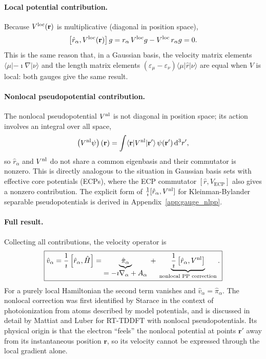 \paragraph{Local potential contribution.}
Because $V^{\mathrm{loc}}(\mathbf{r})$ is multiplicative (diagonal in position
space),
\begin{equation}
  \left[\hat{r}_\alpha,V^{\mathrm{loc}}(\mathbf{r})\right]g
  = r_\alpha\,V^{\mathrm{loc}} g - V^{\mathrm{loc}}\,r_\alpha g = 0.
  \label{eq:comm-r-Vloc}
\end{equation}
This is the same reason that, in a Gaussian basis, the velocity
matrix elements $\langle\mu|-\imath\nabla|\nu\rangle$ and the
length matrix elements $(\varepsilon_\mu - \varepsilon_\nu)
\langle\mu|\hat{r}|\nu\rangle$ are equal when $V$ is local: both
gauges give the same result.

\paragraph{Nonlocal pseudopotential contribution.}
The nonlocal pseudopotential $V^{\mathrm{nl}}$ is not diagonal in position
space; its action involves an integral over all space,
\begin{equation}
  \left(V^{\mathrm{nl}}\psi\right)(\mathbf{r})
  = \int \langle\mathbf{r}|V^{\mathrm{nl}}|\mathbf{r}'\rangle\,
    \psi(\mathbf{r}')\,\mathrm{d}^3r',
  \label{eq:Vnl-nonlocal-action}
\end{equation}
so $\hat{r}_\alpha$ and $V^{\mathrm{nl}}$ do not share a common eigenbasis
and their commutator is nonzero.
This is directly analogous to the situation in Gaussian basis sets
with effective core potentials (ECPs), where the ECP commutator
$[\hat{r},V_\mathrm{ECP}]$ also gives a nonzero
contribution.\cite{starace-1971}
The explicit form of $\frac{1}{\imath}[\hat{r}_\alpha,V^{\mathrm{nl}}]$ for
Kleinman-Bylander separable pseudopotentials is derived in
Appendix~\ref{app:gauge_nlpp}.

\paragraph{Full result.}
Collecting all contributions, the velocity operator is
\begin{equation}
  \boxed{
  \hat{v}_\alpha
  = \frac{1}{\imath}\left[\hat{r}_\alpha,\hat{H}\right]
  = \underbrace{\hat{\pi}_\alpha}_{\displaystyle
    = -\imath\nabla_\alpha + A_\alpha}
  \;+\;
  \underbrace{\frac{1}{\imath}
    \left[\hat{r}_\alpha,V^{\mathrm{nl}}\right]}_{\text{nonlocal PP correction}}.
  }
  \label{eq:v-full}
\end{equation}
For a purely local Hamiltonian the second term vanishes and
$\hat{v}_\alpha = \hat{\pi}_\alpha$.
The nonlocal correction was first identified by
Starace\cite{starace-1971,starace-1973} in the context of
photoionization from atoms described by model potentials, and is
discussed in detail by Mattiat and Luber\cite{Mattiat-Luber-2022}
for RT-TDDFT with nonlocal pseudopotentials.
Its physical origin is that the electron ``feels'' the nonlocal
potential at points $\mathbf{r}'$ away from its instantaneous
position $\mathbf{r}$, so its velocity cannot be expressed through
the local gradient alone.

